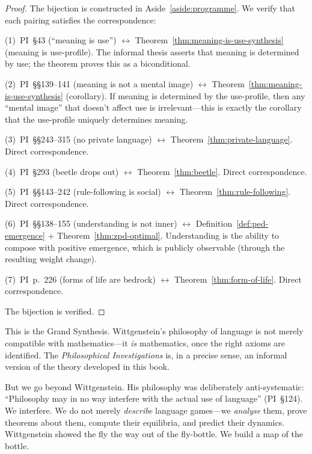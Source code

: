 \begin{proof}
The bijection is constructed in Aside~\ref{aside:programme}.
We verify that each pairing satisfies the correspondence:

(1)~PI~\S43 (``meaning is use'') $\longleftrightarrow$
Theorem~\ref{thm:meaning-is-use-synthesis} (meaning is use-profile).
The informal thesis asserts that meaning is determined by use;
the theorem proves this as a biconditional.

(2)~PI~\S\S139--141 (meaning is not a mental image)
$\longleftrightarrow$ Theorem~\ref{thm:meaning-is-use-synthesis} (corollary).
If meaning is determined by the use-profile, then any ``mental
image'' that doesn't affect use is irrelevant---this is exactly
the corollary that the use-profile uniquely determines meaning.

(3)~PI~\S\S243--315 (no private language) $\longleftrightarrow$
Theorem~\ref{thm:private-language}.  Direct correspondence.

(4)~PI~\S293 (beetle drops out) $\longleftrightarrow$
Theorem~\ref{thm:beetle}.  Direct correspondence.

(5)~PI~\S\S143--242 (rule-following is social) $\longleftrightarrow$
Theorem~\ref{thm:rule-following}.  Direct correspondence.

(6)~PI~\S\S138--155 (understanding is not inner) $\longleftrightarrow$
Definition~\ref{def:ped-emergence} + Theorem~\ref{thm:zpd-optimal}.
Understanding is the ability to compose with positive emergence,
which is publicly observable (through the resulting weight change).

(7)~PI~p.~226 (forms of life are bedrock) $\longleftrightarrow$
Theorem~\ref{thm:form-of-life}.  Direct correspondence.

The bijection is verified.
\end{proof}

\begin{interpretation}
This is the Grand Synthesis.  Wittgenstein's philosophy of language
is not merely compatible with mathematics---it \emph{is}
mathematics, once the right axioms are identified.  The
\textit{Philosophical Investigations} is, in a precise sense,
an informal version of the theory developed in this book.

But we go beyond Wittgenstein.  His philosophy was deliberately
anti-systematic: ``Philosophy may in no way interfere with the
actual use of language'' (PI~\S124).  We interfere.  We do not
merely \emph{describe} language games---we \emph{analyse} them,
prove theorems about them, compute their equilibria, and predict
their dynamics.  Wittgenstein showed the fly the way out of the
fly-bottle.  We build a map of the bottle.
\end{interpretation}

